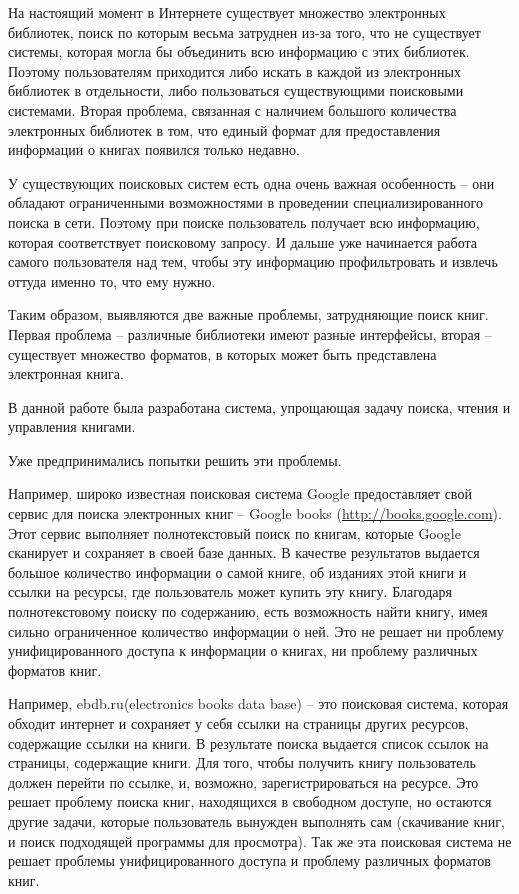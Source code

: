 \documentclass[a4paper]{report}
\begin{document}
На настоящий момент в Интернете существует множество электронных библиотек, поиск по которым весьма затруднен из-за того, что не существует системы, которая могла бы объединить всю информацию с этих библиотек. Поэтому пользователям приходится либо искать в каждой из электронных библиотек в отдельности, либо пользоваться существующими поисковыми системами. Вторая проблема, связанная с наличием большого количества электронных библиотек в том, что единый формат для предоставления информации о книгах появился только недавно. 

У существующих поисковых систем есть одна очень важная особенность -- они обладают ограниченными возможностями в проведении специализированного поиска в сети. Поэтому при поиске пользователь получает всю информацию, которая соответствует поисковому запросу. И дальше уже начинается работа самого пользователя над тем, чтобы эту информацию профильтровать и извлечь оттуда именно то, что ему нужно. 

Таким образом, выявляются две важные проблемы, затрудняющие поиск книг. Первая проблема -- различные библиотеки имеют разные интерфейсы, вторая -- существует множество форматов, в которых может быть представлена электронная книга. 

В данной работе была разработана система, упрощающая задачу поиска, чтения и управления книгами. 



Уже предпринимались попытки решить эти проблемы.

Например, широко известная поисковая система Google предоставляет свой сервис для поиска электронных книг -- Google books (\url{http://books.google.com}). Этот сервис выполняет полнотекстовый поиск по книгам, которые Google сканирует и сохраняет в своей базе данных. В качестве результатов выдается большое количество информации о самой книге, об изданиях этой книги и ссылки на ресурсы, где пользователь может купить эту книгу. Благодаря полнотекстовому поиску  по содержанию, есть возможность найти книгу, имея сильно ограниченное количество информации о ней. Это не решает ни проблему унифицированного доступа к информации о книгах, ни проблему различных форматов книг.

Например, ebdb.ru(electronics books data base)  -- это поисковая система, которая обходит интернет и сохраняет у себя ссылки на страницы других ресурсов, содержащие ссылки на книги. В результате поиска выдается список ссылок на страницы, содержащие книги. Для того, чтобы получить книгу пользователь должен перейти по ссылке, и, возможно, зарегистрироваться на ресурсе. Это решает проблему поиска книг, находящихся в свободном доступе, но остаются другие задачи, которые пользователь вынужден выполнять сам (скачивание книг, и поиск подходящей программы для просмотра). Так же эта поисковая система не решает проблемы унифицированного доступа и проблему различных форматов книг.
\end{document}
